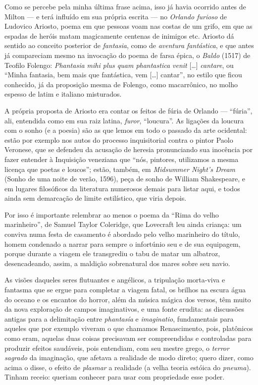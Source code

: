Como se percebe pela minha última frase acima, isso já havia ocorrido
antes de Milton --- e terá influído em sua própria escrita --- no
\emph{Orlando furioso} de Ludovico Ariosto, poema em que
pessoas voam nas costas de um grifo, em que as espadas de heróis matam
magicamente centenas de inimigos etc. Ariosto dá sentido ao conceito
posterior de \emph{fantasia}, como de \emph{aventura fantástica}, e que
antes já compareciam mesmo na invocação do poema de farsa épica, o
\emph{Baldo} (1517) de Teofilo Folengo: \emph{Phantasia mihi
plus quam phantastica venit} [\ldots{}] \emph{cantare}, ou ``Minha fantasia, bem
mais que fantástica, vem [\ldots{}] cantar'', no estilo que ficou conhecido,
já da proposição mesma de Folengo, como macarrônico, no molho
espesso de latim e italiano misturados.

A própria proposta de Ariosto era contar os feitos de fúria de
Orlando --- ``fúria'', ali, entendida como em sua raiz latina,
\emph{furor}, ``loucura''. As ligações da loucura com o
sonho (e a poesia) são as que lemos em todo o passado da arte
ocidental: estão por exemplo nos autos do processo inquisitorial contra
o pintor Paolo Veronese, que se defendeu da acusação de
heresia pronunciando sua inocência por fazer entender à Inquisição
veneziana que ``nós, pintores, utilizamos a mesma licença que poetas e
loucos''; estão, também, em \emph{Midsummer Night's Dream} (Sonho de uma
noite de verão, 1596), peça de sonho de William Shakespeare,
e em lugares filosóficos da literatura numerosos demais para listar
aqui, e todos ainda sem demarcação de limite estilístico, que viria
depois.

Por isso é importante relembrar ao menos o poema da ``Rima do velho
marinheiro'', de Samuel Taylor Coleridge, que Lovecraft leu
ainda criança: um conviva numa festa de casamento é abordado pelo velho
marinheiro do título, homem condenado a narrar para sempre o infortúnio
seu e de sua equipagem, porque durante a viagem ele transgrediu o tabu
de matar um albatroz, desencadeando, assim, a maldição sobrenatural dos
mares sobre seu navio.

As visões daqueles seres flutuantes e angélicos, a tripulação morta-viva
e fantasma que se ergue para completar a viagem fatal, os brilhos na
escura água do oceano e os encantos do horror, além da música mágica dos
versos, têm muito da nova exploração de campos imaginativos, e uma fonte
erudita: as discussões antigas para a delimitação entre \emph{phantasía}
e \emph{imaginatio}, fundamentais para aqueles que por exemplo viveram o
que chamamos Renascimento, pois, platônicos como eram, aquelas
duas coisas precisavam ser compreendidas e controladas para produzir
efeitos saudáveis, pois entendiam, com seu mestre grego, o \emph{terror
sagrado} da imaginação, que afetava a realidade de modo direto; quero
dizer, como acima o disse, o efeito de \emph{plasmar} a realidade (a
velha teoria estóica do \emph{pneuma}). Tinham receio: queriam conhecer
para usar com propriedade esse poder.

